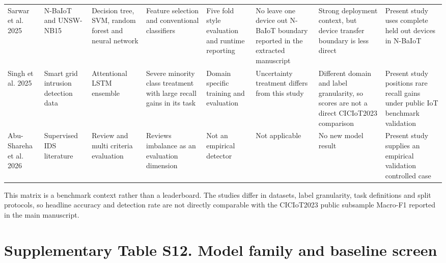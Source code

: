 \documentclass[10pt]{article}
\begin{document}
\begin{center}
\begin{longtable}{p{1.4cm}p{2.0cm}p{2.0cm}p{1.9cm}p{2.5cm}p{1.6cm}p{2.1cm}p{2.6cm}}
Sarwar et al. 2025 & N-BaIoT and UNSW-NB15 & Decision tree, SVM, random forest and neural network & Feature selection and conventional classifiers & Five fold style evaluation and runtime reporting & No leave one device out N-BaIoT boundary reported in the extracted manuscript & Strong deployment context, but device transfer boundary is less direct & Present study uses complete held out devices in N-BaIoT \\
Singh et al. 2025 & Smart grid intrusion detection data & Attentional LSTM ensemble & Severe minority class treatment with large recall gains in its task & Domain specific training and evaluation & Uncertainty treatment differs from this study & Different domain and label granularity, so scores are not a direct CICIoT2023 comparison & Present study positions rare recall gains under public IoT benchmark validation \\
Abu-Shareha et al. 2026 & Supervised IDS literature & Review and multi criteria evaluation & Reviews imbalance as an evaluation dimension & Not an empirical detector & Not applicable & No new model result & Present study supplies an empirical validation controlled case \\
\bottomrule
\end{longtable}
\end{center}

This matrix is a benchmark context rather than a leaderboard. The studies differ in datasets, label granularity, task definitions and split protocols, so headline accuracy and detection rate are not directly comparable with the CICIoT2023 public subsample Macro-F1 reported in the main manuscript.

\section*{Supplementary Table S12. Model family and baseline screen}
\end{document}

